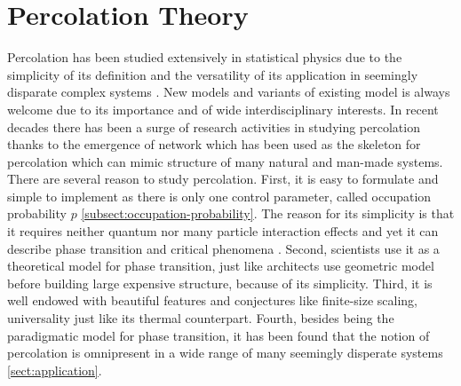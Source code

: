 \chapter{Percolation Theory}
\label{chapter:percolation-theory}
\ifpdf
    \graphicspath{{Chapter4/Figs/}{Chapter4/Figs/playground/}{Chapter4/Figs/entropy_cluster/}}
\else
    \graphicspath{{Chapter4/Figs/}{Chapter4/Figs/playground/}{Chapter4/Figs/entropy_cluster/}}
\fi

Percolation has been studied extensively in statistical physics due to the simplicity of its definition and the versatility of its application in seemingly disparate complex systems \cite{Sahini1994}. New models and variants of existing model is always welcome due to its importance and of wide interdisciplinary interests. In recent decades there has been a surge of research activities in studying percolation thanks to the emergence of network which has been used as the skeleton for percolation which can mimic structure of many natural and man-made systems.\\


There are several reason to study percolation. First, it is easy to formulate and simple to implement as there is only one control parameter, called occupation probability $p$ \ref{subsect:occupation-probability}. The reason for its simplicity is that it requires neither quantum nor many particle interaction effects and yet it can describe phase transition and critical phenomena \cite{Saberi2015, Stauffer1994}.  Second, scientists use it as a theoretical model for phase transition, just like architects use geometric model before building large expensive structure, because of its simplicity. Third, it is well endowed with beautiful features and conjectures like finite-size scaling, universality just like its thermal counterpart. Fourth, besides being the paradigmatic model for phase transition, it has been found that the notion of percolation is omnipresent in a wide range of many seemingly disperate systems \ref{sect:application}.\\

